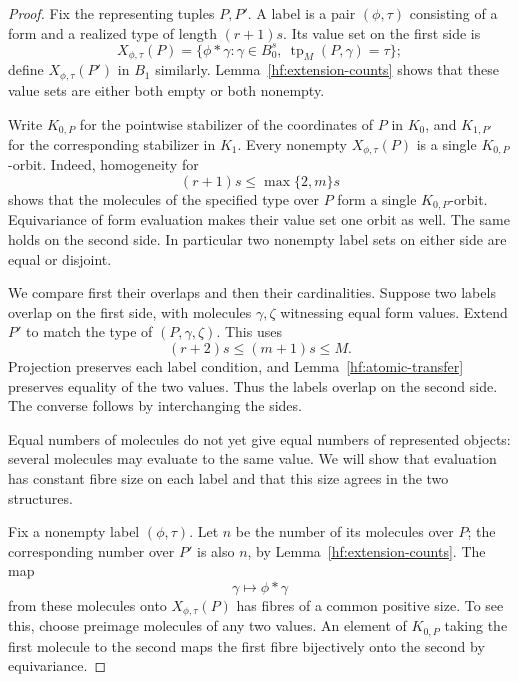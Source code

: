 \begin{proof}
Fix the representing tuples $P,P'$.
A label is a pair $(\phi,\tau)$ consisting of a form and a realized
type of length $(r+1)s$.  Its value set on the first side is
\[
 X_{\phi,\tau}(P)=
 \{\phi*\gamma:\gamma\in B_0^s,\
                 \operatorname{tp}_M(P,\gamma)=\tau\};
\]
define $X_{\phi,\tau}(P')$ in $B_1$ similarly.
Lemma~\ref{hf:extension-counts} shows that these value sets are either
both empty or both nonempty.

Write $K_{0,P}$ for the pointwise stabilizer of the coordinates of $P$
in $K_0$, and $K_{1,P'}$ for the corresponding stabilizer in $K_1$.
Every nonempty $X_{\phi,\tau}(P)$ is a single $K_{0,P}$-orbit.
Indeed, homogeneity for
\[
                (r+1)s\leq\max\{2,m\}s
\]
shows that the molecules of the specified type over $P$ form a single
$K_{0,P}$-orbit.  Equivariance of form evaluation makes their value set
one orbit as well.  The same holds on the second side.
In particular two nonempty label sets on either side are equal or
disjoint.

We compare first their overlaps and then their cardinalities.
Suppose two labels overlap on the first side, with molecules
$\gamma,\zeta$ witnessing equal form values.
Extend $P'$ to match the type of $(P,\gamma,\zeta)$.
This uses
\[
                     (r+2)s\leq(m+1)s\leq M.
\]
Projection preserves each label condition, and
Lemma~\ref{hf:atomic-transfer} preserves equality of the two values.
Thus the labels overlap on the second side.
The converse follows by interchanging the sides.

Equal numbers of molecules do not yet give equal numbers of represented
objects: several molecules may evaluate to the same value. We will show
that evaluation has constant fibre size on each label and that this size
agrees in the two structures.

Fix a nonempty label $(\phi,\tau)$.
Let $n$ be the number of its molecules over $P$; the corresponding
number over $P'$ is also $n$, by Lemma~\ref{hf:extension-counts}.
The map
\[
                 \gamma\longmapsto\phi*\gamma
\]
from these molecules onto $X_{\phi,\tau}(P)$ has fibres of a common
positive size.  To see this, choose preimage molecules of any two
values.  An element of $K_{0,P}$ taking the first molecule to the
second maps the first fibre bijectively onto the second by equivariance.


\end{proof}
